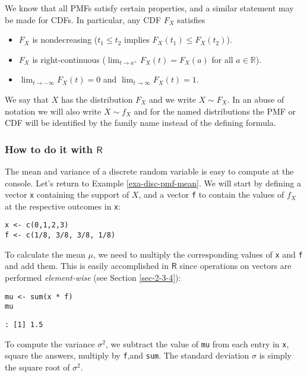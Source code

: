 We know that all PMFs satisfy certain properties, and a similar
statement may be made for CDFs. In particular, any CDF \(F_{X}\)
satisfies
\begin{itemize}
\item \(F_{X}\) is nondecreasing (\(t_{1}\leq t_{2}\) implies
\(F_{X}(t_{1})\leq F_{X}(t_{2})\)).
\item \(F_{X}\) is right-continuous (\(\lim_{t\to
  a^{+}}F_{X}(t)=F_{X}(a)\) for all \(a\in\mathbb{R}\)).
\item \(\lim_{t\to-\infty}F_{X}(t)=0\) and
\(\lim_{t\to\infty}F_{X}(t)=1\).
\end{itemize}
We say that \(X\) has the distribution \(F_{X}\) and we write \(X\sim
F_{X}\). In an abuse of notation we will also write \(X\sim f_{X}\)
and for the named distributions the PMF or CDF will be identified by
the family name instead of the defining formula.

\subsubsection{How to do it with \(\mathsf{R}\)}
\label{sec-5-1-2-1}

The mean and variance of a discrete random variable is easy to compute
at the console. Let's return to Example \ref{exa-disc-pmf-mean}. We will start
by defining a vector \texttt{x} containing the support of \(X\), and a vector
\texttt{f} to contain the values of \(f_{X}\) at the respective outcomes in
\texttt{x}:

\begin{verbatim}
x <- c(0,1,2,3)
f <- c(1/8, 3/8, 3/8, 1/8)
\end{verbatim}

To calculate the mean \(\mu\), we need to multiply the corresponding
values of \texttt{x} and \texttt{f} and add them. This is easily accomplished in
\(\mathsf{R}\) since operations on vectors are performed
\emph{element-wise} (see Section \ref{sec-2-3-4}):

\begin{verbatim}
mu <- sum(x * f)
mu
\end{verbatim}

\begin{verbatim}
: [1] 1.5
\end{verbatim}

To compute the variance \(\sigma^{2}\), we subtract the value of \texttt{mu}
from each entry in \texttt{x}, square the answers, multiply by \texttt{f},and
\texttt{sum}. The standard deviation \(\sigma\) is simply the square root of
\(\sigma^{2}\).

